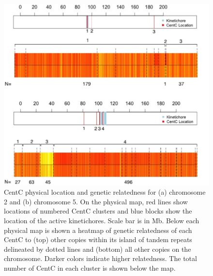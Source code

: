 \begin{figure}
\includegraphics[width=1\textwidth]{heatmap.png}
\caption{CentC physical location and genetic relatedness for (a) chromosome 2 and (b) chromosome 5.  On the physical map, red lines show locations of numbered CentC clusters and blue blocks show the location of the active kinetichores.  Scale bar is in Mb.  Below each physical map is shown a heatmap of genetic relatedness of each CentC to (top) other copies within its island of tandem repeats delineated by dotted lines and (bottom) all other copies on the chromosome.  Darker colors indicate higher relatedness.  The total number of CentC in each cluster is shown below the map.  
}
\label{heatmap}    
\end{figure}

